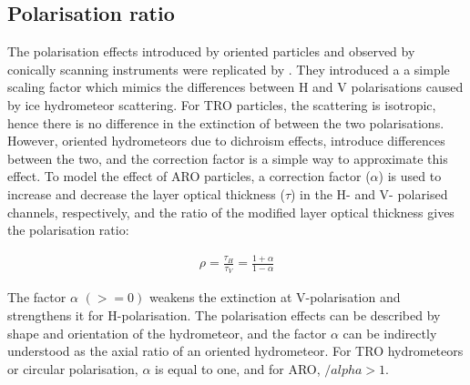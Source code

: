 \documentclass[amt, manuscript]{copernicus}
\begin{document}
\subsection{Polarisation ratio}
\label{sec:polratio_selection}

The polarisation effects introduced by oriented particles and observed by conically scanning instruments \citep{gong:micro:17} were replicated by \citet{barlakas:intro:21}. They introduced a a simple scaling factor which mimics the differences between H and V polarisations caused by ice hydrometeor scattering. For TRO particles, the scattering is isotropic, hence there is no difference in the extinction of between the two polarisations. However, oriented hydrometeors due to dichroism effects, introduce differences between the two, and the correction factor is a simple way to approximate this effect. To model the effect of ARO particles, a correction factor ($\alpha$) is used to increase and decrease the layer optical thickness ($\tau$) in the H- and V-
polarised channels, respectively, and the ratio of the modified layer optical thickness gives the polarisation ratio:

\begin{eqnarray}
\rho = \frac{\tau_H}{\tau_V} = \frac{1+\alpha}{1-\alpha}
\end{eqnarray}

The factor $\alpha$ $(>= 0)$  weakens the extinction at V-polarisation and strengthens it for H-polarisation. The polarisation effects can be described by shape and orientation of the hydrometeor, and the factor $\alpha$ can be indirectly understood as the axial ratio of an oriented hydrometeor. For TRO hydrometeors or circular polarisation, $\alpha$ is equal to one, and for ARO, $/alpha > 1$. 
\end{document}
